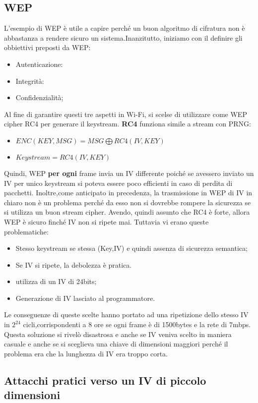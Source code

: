 \documentclass{article}
\theoremstyle{remark}
\begin{document}
\subsection{WEP}
L'esempio di WEP è utile a capire perché un buon algoritmo di cifratura non è abbastanza a rendere sicuro un sistema.Inanzitutto, iniziamo con il definire gli obbiettivi preposti da WEP:
\begin{itemize}
	\item Autenticazione:
	\item Integrità:
	\item Confidenzialità;
\end{itemize}
Al fine di garantire questi tre aspetti in Wi-Fi, si scelse di utilizzare come WEP cipher RC4 per generare il keystream.
\textbf{RC4} funziona simile a stream con PRNG:
\begin{itemize}
	\item $ENC(KEY,MSG)= MSG \bigoplus RC4(IV,KEY)$
	\item $Keystream = RC4(IV,KEY)$
\end{itemize}
Quindi, WEP \textbf{per ogni} frame invia un IV differente poiché se avessero inviato un IV per unico keystream si poteva essere poco efficienti in caso di perdita di pacchetti. Inoltre,come  anticipato in precedenza, la trasmissione in WEP di IV in chiaro non è un problema perché da esso non si dovrebbe rompere la sicurezza se si utilizza un buon stream cipher.
Avendo, quindi assunto che RC4 è forte, allora WEP è sicuro finché IV non si ripete mai. Tuttavia vi erano queste problematiche:
\begin{itemize}
	\item Stesso keystream se stessa (Key,IV) e quindi assenza di sicurezza semantica;
	\item Se IV si ripete, la debolezza è pratica.
	\item utilizza di un IV di 24bits;
	\item Generazione di IV lasciato al programmatore.
\end{itemize}
Le conseguenze di queste scelte hanno portato ad una ripetizione dello stesso IV in $2^{24}$ cicli,corrispondenti a 8 ore se ogni frame è di 1500bytes e la rete di 7mbps.
Questa soluzione si rivelò disastrosa e anche se IV veniva scelto in maniera casuale e anche se si sceglieva una chiave di dimensioni maggiori perché il problema era che la lunghezza di IV era troppo corta.
\subsection{Attacchi pratici verso un IV di piccolo dimensioni}
\end{document}
